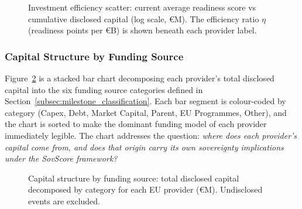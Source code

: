\begin{figure}[htbp]
  \centering
  \caption{Investment efficiency scatter: current average readiness score vs cumulative disclosed capital (log scale, €M). The efficiency ratio $\eta$ (readiness points per €B) is shown beneath each provider label.}
  \label{fig:financial_row3_left}
\end{figure}

\subsubsection{Capital Structure by Funding Source}
\label{subsubsec:chart_capital_structure}

Figure~\ref{fig:financial_row3_right} is a stacked bar chart decomposing each provider's total disclosed capital into the six funding source categories defined in Section~\ref{subsec:milestone_classification}. Each bar segment is colour-coded by category (Capex, Debt, Market Capital, Parent, EU Programmes, Other), and the chart is sorted to make the dominant funding model of each provider immediately legible. The chart addresses the question: \emph{where does each provider's capital come from, and does that origin carry its own sovereignty implications under the SovScore framework?}

\begin{figure}[htbp]
  \centering
  \caption{Capital structure by funding source: total disclosed capital decomposed by category for each EU provider (€M). Undisclosed events are excluded.}
  \label{fig:financial_row3_right}
\end{figure}

